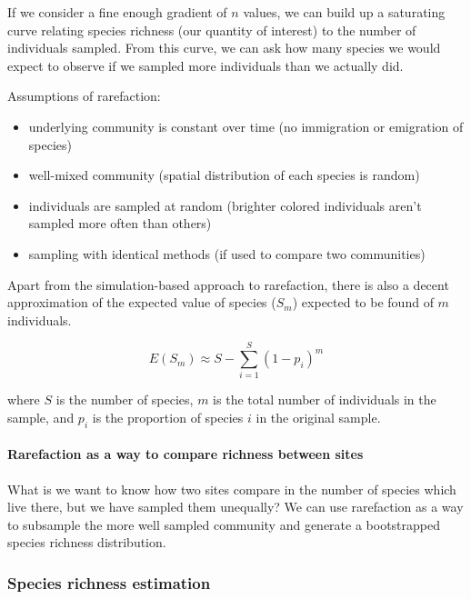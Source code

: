\documentclass[12pt]{article}
\begin{document}
If we consider a fine enough gradient of $n$ values, we can build up a saturating curve relating species richness (our quantity of interest) to the number of individuals sampled. From this curve, we can ask how many species we would expect to observe if we sampled more individuals than we actually did. 



Assumptions of rarefaction:
\begin{itemize}
  \item underlying community is constant over time (no immigration or emigration of species)
  \item well-mixed community (spatial distribution of each species is random)
  \item individuals are sampled at random (brighter colored individuals aren't sampled more often than others)
  \item sampling with identical methods (if used to compare two communities)
\end{itemize}



Apart from the simulation-based approach to rarefaction, there is also a decent approximation of the expected value of species ($S_{m}$) expected to be found of $m$ individuals. 

\[ E(S_{m}) \approx S - \sum_{i=1}^{S}(1-p_{i})^{m} \]

where $S$ is the number of species, $m$ is the total number of individuals in the sample, and $p_i$ is the proportion of species $i$ in the original sample. 




\paragraph*{Rarefaction as a way to compare richness between sites}
What is we want to know how two sites compare in the number of species which live there, but we have sampled them unequally? We can use rarefaction as a way to subsample the more well sampled community and generate a bootstrapped species richness distribution. 










\subsubsection*{Species richness estimation}
\end{document}
